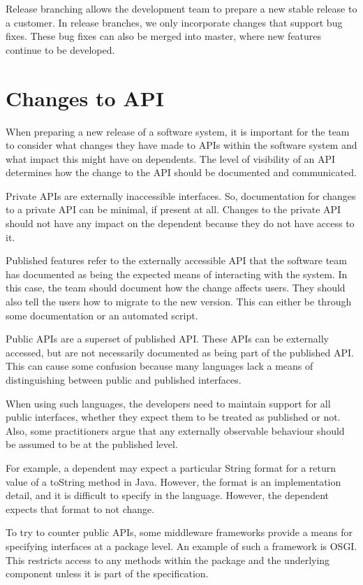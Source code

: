 \documentclass[a4paper, openany]{memoir}
\begin{document}
Release branching allows the development team to prepare a new stable release to a customer. In release branches, we only incorporate changes that support bug fixes. These bug fixes can also be merged into master, where new features continue to be developed.

\section{Changes to API}
When preparing a new release of a software system, it is important for the team to consider what changes they have made to APIs within the software system and what impact this might have on dependents. The level of visibility of an API determines how the change to the API should be documented and communicated.

Private APIs are externally inaccessible interfaces. So, documentation for changes to a private API can be minimal, if present at all. Changes to the private API should not have any impact on the dependent because they do not have access to it.

Published features refer to the externally accessible API that the software team has documented as being the expected means of interacting with the system. In this case, the team should document how the change affects users. They should also tell the users how to migrate to the new version. This can either be through some documentation or an automated script.

Public APIs are a superset of published API. These APIs can be externally accessed, but are not necessarily documented as being part of the published API. This can cause some confusion because many languages lack a means of distinguishing between public and published interfaces.

When using such languages, the developers need to maintain support for all public interfaces, whether they expect them to be treated as published or not. Also, some practitioners argue that any externally observable behaviour should be assumed to be at the published level.

For example, a dependent may expect a particular String format for a return value of a toString method in Java. However, the format is an implementation detail, and it is difficult to specify in the language. However, the dependent expects that format to not change. 

To try to counter public APIs, some middleware frameworks provide a means for specifying interfaces at a package level. An example of such a framework is OSGI. This restricts access to any methods within the package and the underlying component unless it is part of the specification.
\end{document}
